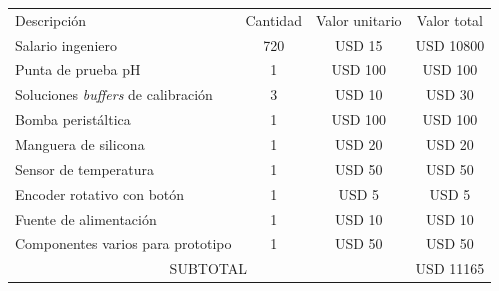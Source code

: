 \documentclass[
11pt, %
codirector, %
]{charter}
\begin{document}
\begin{table}[htpb]
\centering
\begin{tabularx}{\linewidth}{@{}|X|c|r|r|@{}}
\hline
\rowcolor[HTML]{C0C0C0} 
\multicolumn{4}{|c|}{\cellcolor[HTML]{C0C0C0}COSTOS DIRECTOS} \\ \hline
\rowcolor[HTML]{C0C0C0} 
Descripción &
  \multicolumn{1}{c|}{\cellcolor[HTML]{C0C0C0}Cantidad} &
  \multicolumn{1}{c|}{\cellcolor[HTML]{C0C0C0}Valor unitario} &
  \multicolumn{1}{c|}{\cellcolor[HTML]{C0C0C0}Valor total} \\ \hline
 
 Salario ingeniero &
  \multicolumn{1}{c|}{ 720 } &
  \multicolumn{1}{c|}{ USD 15 } &
  \multicolumn{1}{c|}{ USD 10800 } \\ \hline
  
 Punta de prueba pH &
  \multicolumn{1}{c|}{ 1 } &
  \multicolumn{1}{c|}{ USD 100 } &
  \multicolumn{1}{c|}{ USD 100 } \\ \hline
  
 Soluciones \textit{buffers} de calibración &
  \multicolumn{1}{c|}{ 3 } &
  \multicolumn{1}{c|}{ USD 10 } &
  \multicolumn{1}{c|}{ USD 30 } \\ \hline
  
 Bomba peristáltica &
  \multicolumn{1}{c|}{ 1 } &
  \multicolumn{1}{c|}{ USD 100 } &
  \multicolumn{1}{c|}{ USD 100 } \\ \hline
  
 Manguera de silicona &
  \multicolumn{1}{c|}{ 1 } &
  \multicolumn{1}{c|}{ USD 20 } &
  \multicolumn{1}{c|}{ USD 20 } \\ \hline

 Sensor de temperatura &
  \multicolumn{1}{c|}{ 1 } &
  \multicolumn{1}{c|}{ USD 50 } &
  \multicolumn{1}{c|}{ USD 50 } \\ \hline
  
 Encoder rotativo con botón &
  \multicolumn{1}{c|}{ 1 } &
  \multicolumn{1}{c|}{ USD 5 } &
  \multicolumn{1}{c|}{ USD 5 } \\ \hline
  
 Fuente de alimentación &
  \multicolumn{1}{c|}{ 1 } &
  \multicolumn{1}{c|}{ USD 10 } &
  \multicolumn{1}{c|}{ USD 10 } \\ \hline   

 Componentes varios para prototipo &
  \multicolumn{1}{c|}{ 1 } &
  \multicolumn{1}{c|}{ USD 50 } &
  \multicolumn{1}{c|}{ USD 50 } \\ \hline  
  
\multicolumn{3}{|c|}{SUBTOTAL} &
  \multicolumn{1}{c|}{ USD 11165 } \\ \hline
  

\end{tabularx}
\end{table}
\end{document}

